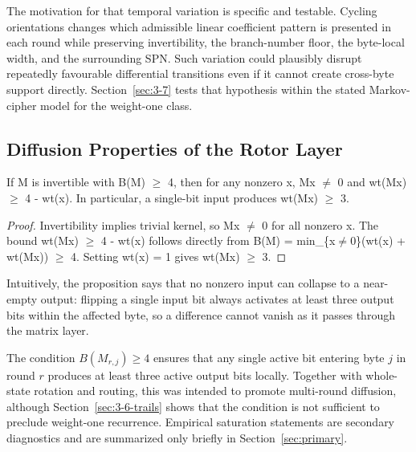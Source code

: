 \documentclass[cryptography,article,submit,oneauthor]{Definitions/mdpi}
\begin{document}
The motivation for that temporal variation is specific and testable. Cycling orientations changes which admissible linear coefficient pattern is presented in each round while preserving invertibility, the branch-number floor, the byte-local width, and the surrounding SPN. Such variation could plausibly disrupt repeatedly favourable differential transitions even if it cannot create cross-byte support directly. Section~\ref{sec:3-7} tests that hypothesis within the stated Markov-cipher model for the weight-one class.\par
\subsection{Diffusion Properties of the Rotor Layer}\label{sec:3-6}
\begin{Proposition}\label{prop:weight}
If M is invertible with B(M) \ensuremath{\geq} 4, then for any nonzero x, Mx \ensuremath{\neq} 0 and wt(Mx) \ensuremath{\geq} 4 - wt(x). In particular, a single-bit input produces wt(Mx) \ensuremath{\geq} 3.
\end{Proposition}

\begin{proof}
Invertibility implies trivial kernel, so Mx \ensuremath{\neq} 0 for all nonzero x. The bound wt(Mx) \ensuremath{\geq} 4 - wt(x) follows directly from B(M) = min\_\{x\ensuremath{\neq}0\}(wt(x) + wt(Mx)) \ensuremath{\geq} 4. Setting wt(x) = 1 gives wt(Mx) \ensuremath{\geq} 3.
\end{proof}

Intuitively, the proposition says that no nonzero input can collapse to a near-empty output: flipping a single input bit always activates at least three output bits within the affected byte, so a difference cannot vanish as it passes through the matrix layer.\par
The condition $B(M_{r,j})\geq4$ ensures that any single active bit entering byte $j$ in round $r$ produces at least three active output bits locally. Together with whole-state rotation and routing, this was intended to promote multi-round diffusion, although Section~\ref{sec:3-6-trails} shows that the condition is not sufficient to preclude weight-one recurrence. Empirical saturation statements are secondary diagnostics and are summarized only briefly in Section~\ref{sec:primary}.\par
\end{document}
